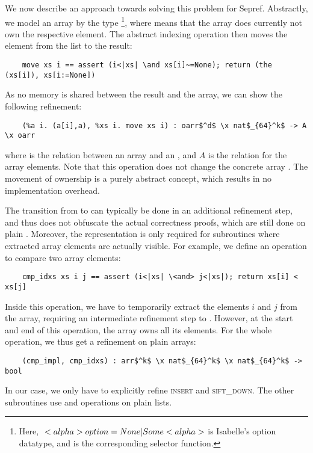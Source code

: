 \documentclass[runningheads]{llncs}
\begin{document}
  We now describe an approach towards solving this problem for Sepref.
  Abstractly, we model an array by the type \footnote{Here, \is$\\<alpha> option = None | Some \\<alpha>$ is Isabelle's option datatype,
  and  is the corresponding selector function.},
  where  means that the array does currently not own the respective element.
  The abstract indexing operation then moves the
  element from the list to the result:
  \begin{lstlisting}
    move xs i == assert (i<|xs| \and xs[i]~=None); return (the (xs[i]), xs[i:=None])
  \end{lstlisting}
  As no memory is shared between the result and the array, we can show the following refinement:
  \begin{lstlisting}
    (%a i. (a[i],a), %xs i. move xs i) : oarr$^d$ \x nat$_{64}^k$ -> A \x oarr
  \end{lstlisting}
  where  is the relation between an array and an , and \is$A$ is the relation for the array elements.
  Note that this operation does not change the concrete array . The movement of ownership is a purely abstract concept, which results
  in no implementation overhead.

  The transition from  to  can typically be done in an additional refinement step,
  and thus does not obfuscate the actual correctness proofs, which are still done on plain .
  Moreover, the  representation is only required for subroutines where extracted array elements are actually visible.
  For example, we define an operation to compare two array elements:
  \begin{lstlisting}
    cmp_idxs xs i j == assert (i<|xs| \<and> j<|xs|); return xs[i] < xs[j]
  \end{lstlisting}
  Inside this operation, we have to temporarily extract the elements $i$ and $j$ from the array,
  requiring an intermediate refinement step to .
  However, at the start and end of this operation, the array owns all its elements. For the whole operation, we thus get
  a refinement on plain arrays:
  \begin{lstlisting}
    (cmp_impl, cmp_idxs) : arr$^k$ \x nat$_{64}^k$ \x nat$_{64}^k$ -> bool
  \end{lstlisting}
  In our case, we only have to explicitly refine \textsc{insert} and \textsc{sift\_down}.
  The other subroutines use  and  operations on plain lists.
\end{document}

